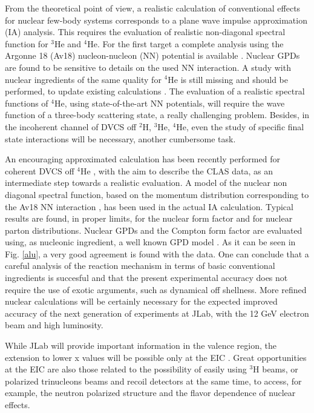 From the theoretical point of view, a realistic calculation 
of conventional effects for
nuclear few-body systems corresponds to a plane wave impulse approximation 
(IA) analysis. This requires the evaluation of realistic non-diagonal spectral
function for $^3$He and $^4$He.
For the first target a complete analysis using the Argonne 18 (Av18)
nucleon-nucleon (NN) potential is available
\cite{Scopetta:2004kj,Scopetta:2009sn,Rinaldi:2012pj,
Rinaldi:2012ft,Rinaldi:2014bba}.
Nuclear GPDs are found to be sensitive to details on 
the used NN interaction.
A study with nuclear ingredients of the same quality
for $^4$He is still missing and should be performed, to update 
existing calculations \cite{Guzey:2003jh,Liuti:2005gi}. 
The evaluation of a realistic spectral functions of $^4$He,
using state-of-the-art NN potentials,
will require the wave function of a three-body scattering state, 
a really challenging problem.
Besides, in the incoherent channel of DVCS off $^2$H, $^3$He, $^4$He,
even the study of specific final state interactions will be necessary,
another cumbersome task. 

An encouraging approximated calculation has been recently
performed for coherent DVCS off $^4$He \cite{sara}, with the aim to
describe the CLAS data, as an intermediate
step towards a realistic evaluation.
A model of the nuclear non diagonal spectral function, 
based on the momentum distribution
corresponding to the Av18 NN interaction
\cite{vivia}, has been used in the 
actual IA
calculation. Typical results
are found, in proper limits, for the nuclear form factor
and for nuclear parton distributions.
Nuclear GPDs and the
Compton form factor are evaluated using, as nucleonic ingredient,
a well known GPD model \cite{gk}. 
As it can be seen in Fig. \ref{alu}, a very good agreement 
is found with the data.  
One can conclude that 
a careful analysis of the reaction mechanism in terms of
basic conventional ingredients is succesful and that
the present experimental accuracy does not require
the use of exotic arguments, such as dynamical off shellness.
More refined nuclear calculations will be certainly necessary for 
the expected improved accuracy of the next generation of experiments 
at JLab, with the 12 GeV electron beam and high luminosity. 
  
While JLab will provide important information
in the valence region, the extension to lower
x values will be possible only at the EIC \cite{Accardi:2012qut}. 
Great opportunities at the EIC are also those related to the possibility
of easily using $^3$H beams, or polarized trinucleons beams and 
recoil detectors at the same time, to access, for example, 
the neutron polarized structure and the flavor dependence 
of nuclear effects.





